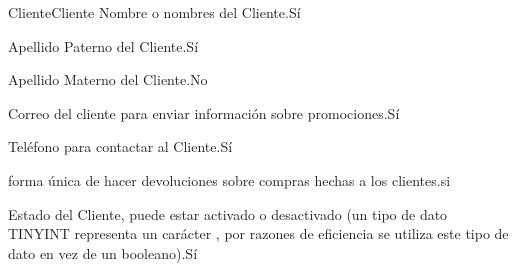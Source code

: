 \begin{cdtEntidad}{Cliente}{Cliente}
		{Nombre o nombres del Cliente.}{Sí}
		
		{Apellido Paterno del Cliente.}{Sí}
		
		{Apellido Materno del Cliente.}{No}
		
		{Correo del cliente para enviar información sobre promociones.}{Sí}
		
		{Teléfono para contactar al Cliente.}{Sí}
		
		{forma única de hacer devoluciones sobre compras hechas a los clientes.}{si}

		{Estado del Cliente, puede estar activado o desactivado (un tipo de dato TINYINT representa un carácter , por razones de eficiencia se utiliza este tipo de dato en vez de un booleano).}{Sí}	
		
		\cdtEntityRelSection
\end{cdtEntidad}


